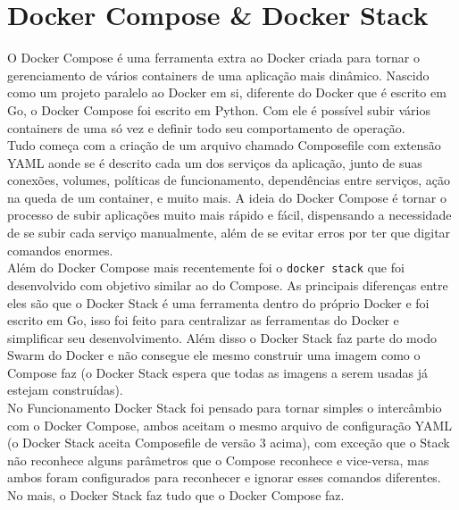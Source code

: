 \documentclass[twocolumn, letterpaper]{scrartcl}
\begin{document}
\section*{\color{triton_blue}Docker Compose \& Docker Stack}
O Docker Compose é uma ferramenta extra ao Docker criada para tornar o gerenciamento de vários containers de uma aplicação mais dinâmico. Nascido como um projeto paralelo ao Docker em si, diferente do Docker que é escrito em Go, o Docker Compose foi escrito em Python. Com ele é possível subir vários containers de uma só vez e definir todo seu comportamento de operação.\\
Tudo começa com a criação de um arquivo chamado Composefile com extensão YAML aonde se é descrito cada um dos serviços da aplicação, junto de suas conexões, volumes, políticas de funcionamento, dependências entre serviços, ação na queda de um container, e muito mais. A ideia do Docker Compose é tornar o processo de subir aplicações muito mais rápido e fácil, dispensando a necessidade de se subir cada serviço manualmente, além de se evitar erros por ter que digitar comandos enormes.\\
Além do Docker Compose mais recentemente foi o \texttt{docker stack} que foi desenvolvido com objetivo similar ao do Compose. As principais diferenças entre eles são que o Docker Stack é uma ferramenta dentro do próprio Docker e foi escrito em Go, isso foi feito para centralizar as ferramentas do Docker e simplificar seu desenvolvimento. Além disso o Docker Stack faz parte do modo Swarm do Docker e não consegue ele mesmo construir uma imagem como o Compose faz (o Docker Stack espera que todas as imagens a serem usadas já estejam construídas).\\
No Funcionamento Docker Stack foi pensado para tornar simples o intercâmbio com o Docker Compose, ambos aceitam o mesmo arquivo de configuração YAML (o Docker Stack aceita Composefile de versão 3 acima), com exceção que o Stack não reconhece alguns parâmetros que o Compose reconhece e vice-versa, mas ambos foram configurados para reconhecer e ignorar esses comandos diferentes. No mais, o Docker Stack faz tudo que o Docker Compose faz.



% 
\end{document}
